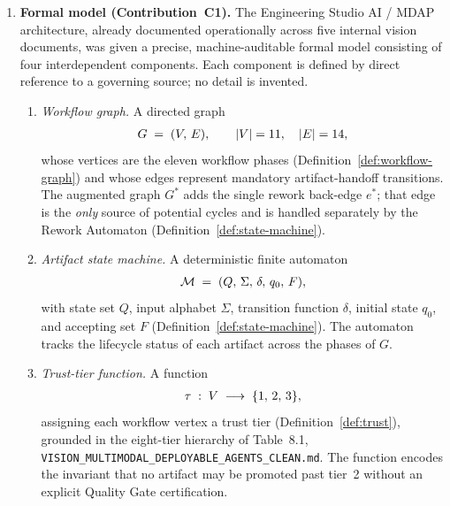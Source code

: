 \documentclass[12pt]{article}
\theoremstyle{definition}
\newcommand{\code}[1]{\texttt{#1}}
\newcommand{\VisionClean}{\code{VISION\_MULTIMODAL\_\allowbreak DEPLOYABLE\_\allowbreak AGENTS\_CLEAN.md}}
\begin{document}
\begin{enumerate}

    \item \textbf{Formal model (Contribution~C1).}
          The Engineering Studio AI / MDAP architecture, already
          documented operationally across five internal vision documents,
          was given a precise, machine-auditable formal model consisting
          of four interdependent components.  Each component is defined
          by direct reference to a governing source; no detail is
          invented.

          \begin{enumerate}
              \item[C1a.] \emph{Workflow graph.}
                    A directed graph
                    \begin{align}
                        G \;=\; (V,\, E),
                        \qquad
                        |V| = 11,\quad |E| = 14,
                        \notag
                    \end{align}
                    whose vertices are the eleven workflow phases
                    (Definition~\ref{def:workflow-graph}) and whose edges
                    represent mandatory artifact-handoff transitions.
                    The augmented graph $G^{*}$ adds the single rework
                    back-edge $e^{*}$; that edge is the \emph{only}
                    source of potential cycles and is handled
                    separately by the Rework Automaton
                    (Definition~\ref{def:state-machine}).

              \item[C1b.] \emph{Artifact state machine.}
                    A deterministic finite automaton
                    \begin{align}
                        \mathcal{M}
                        \;=\;
                        (Q,\,\Sigma,\,\delta,\,q_0,\,F),
                        \notag
                    \end{align}
                    with state set $Q$, input alphabet $\Sigma$,
                    transition function $\delta$, initial state $q_0$,
                    and accepting set $F$ (Definition~\ref{def:state-machine}).
                    The automaton tracks the lifecycle status of each
                    artifact across the phases of $G$.

              \item[C1c.] \emph{Trust-tier function.}
                    A function
                    \begin{align}
                        \tau \;:\; V \;\longrightarrow\;
                        \{1,\,2,\,3\},
                        \notag
                    \end{align}
                    assigning each workflow vertex a trust tier
                    (Definition~\ref{def:trust}), grounded in the
                    eight-tier hierarchy of Table~8.1, \VisionClean{}.
                    The function encodes the invariant that no artifact
                    may be promoted past tier~2 without an explicit
                    Quality Gate certification.


\end{enumerate}
\end{enumerate}
\end{document}
